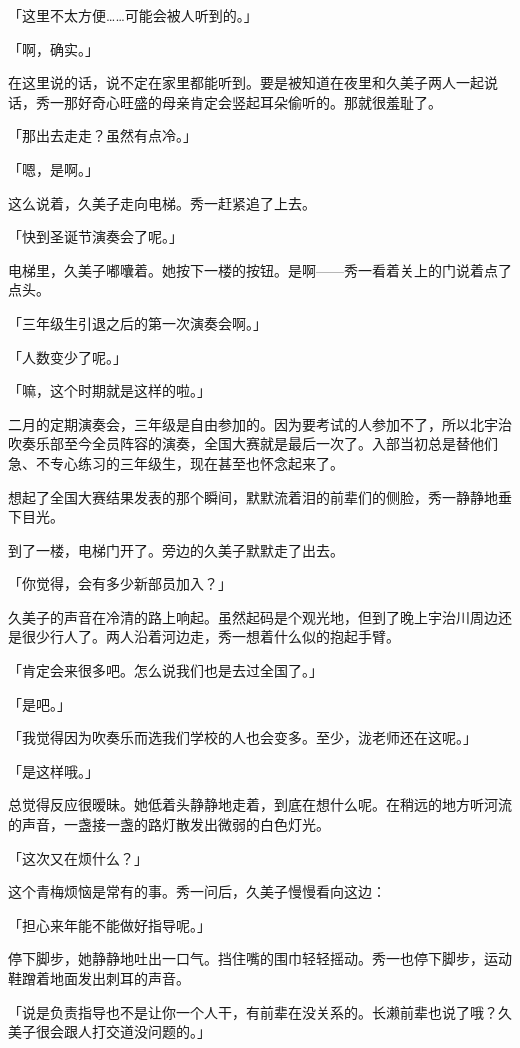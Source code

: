 \documentclass[UTF8]{ctexart}
\begin{document}
    「这里不太方便……可能会被人听到的。」

    「啊，确实。」

    在这里说的话，说不定在家里都能听到。要是被知道在夜里和久美子两人一起说话，秀一那好奇心旺盛的母亲肯定会竖起耳朵偷听的。那就很羞耻了。

    「那出去走走？虽然有点冷。」

    「嗯，是啊。」

    这么说着，久美子走向电梯。秀一赶紧追了上去。

    「快到圣诞节演奏会了呢。」

    电梯里，久美子嘟囔着。她按下一楼的按钮。是啊——秀一看着关上的门说着点了点头。

    「三年级生引退之后的第一次演奏会啊。」

    「人数变少了呢。」

    「嘛，这个时期就是这样的啦。」

    二月的定期演奏会，三年级是自由参加的。因为要考试的人参加不了，所以北宇治吹奏乐部至今全员阵容的演奏，全国大赛就是最后一次了。入部当初总是替他们急、不专心练习的三年级生，现在甚至也怀念起来了。

    想起了全国大赛结果发表的那个瞬间，默默流着泪的前辈们的侧脸，秀一静静地垂下目光。

    到了一楼，电梯门开了。旁边的久美子默默走了出去。



    「你觉得，会有多少新部员加入？」

    久美子的声音在冷清的路上响起。虽然起码是个观光地，但到了晚上宇治川周边还是很少行人了。两人沿着河边走，秀一想着什么似的抱起手臂。

    「肯定会来很多吧。怎么说我们也是去过全国了。」

    「是吧。」

    「我觉得因为吹奏乐而选我们学校的人也会变多。至少，泷老师还在这呢。」

    「是这样哦。」

    总觉得反应很暧昧。她低着头静静地走着，到底在想什么呢。在稍远的地方听河流的声音，一盏接一盏的路灯散发出微弱的白色灯光。

    「这次又在烦什么？」

    这个青梅烦恼是常有的事。秀一问后，久美子慢慢看向这边：

    「担心来年能不能做好指导呢。」

    停下脚步，她静静地吐出一口气。挡住嘴的围巾轻轻摇动。秀一也停下脚步，运动鞋蹭着地面发出刺耳的声音。

    「说是负责指导也不是让你一个人干，有前辈在没关系的。长濑前辈也说了哦？久美子很会跟人打交道没问题的。」
\end{document}
